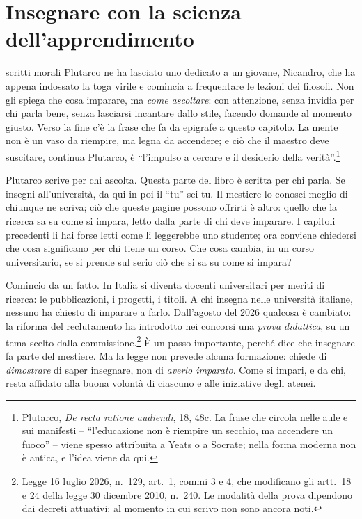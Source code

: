 \chapter{Insegnare con la scienza dell'apprendimento}
\label{cap:docenti}


 scritti morali Plutarco ne ha lasciato uno
dedicato a un giovane, Nicandro, che ha appena indossato la toga
virile e comincia a frequentare le lezioni dei filosofi. Non gli
spiega che cosa imparare, ma \emph{come ascoltare}: con attenzione,
senza invidia per chi parla bene, senza lasciarsi incantare dallo
stile, facendo domande al momento giusto. Verso la fine c'è la frase
che fa da epigrafe a questo capitolo. La mente non è un vaso da
riempire, ma legna da accendere; e ciò che il maestro deve suscitare,
continua Plutarco, è \enquote{l'impulso a cercare e il desiderio della
verità}.\footnote{Plutarco, \emph{De recta ratione audiendi}, 18,
48c. La frase che circola nelle aule e sui manifesti --
\enquote{l'educazione non è riempire un secchio, ma accendere un
fuoco} -- viene spesso attribuita a Yeats o a Socrate; nella forma
moderna non è antica, e l'idea viene da qui.}

Plutarco scrive per chi ascolta. Questa parte del libro è scritta per
chi parla. Se insegni all'università, da qui in poi il \enquote{tu}
sei tu. Il mestiere lo conosci meglio di chiunque ne scriva; ciò che
queste pagine possono offrirti è altro: quello che la ricerca sa su
come si impara, letto dalla parte di chi deve imparare. I capitoli
precedenti li hai forse letti come li leggerebbe uno studente; ora
conviene chiedersi che cosa significano per chi tiene un corso. Che
cosa cambia, in un corso universitario, se si prende sul serio ciò
che si sa su come si impara?

Comincio da un fatto. In Italia si diventa docenti universitari per
meriti di ricerca: le pubblicazioni, i progetti, i titoli. A chi insegna nelle università italiane, nessuno ha chiesto di
imparare a farlo. Dall'agosto del 2026
qualcosa è cambiato: la riforma del reclutamento ha introdotto nei
concorsi una \emph{prova didattica}, su un tema scelto dalla
commissione.\footnote{Legge 16 luglio 2026, n.~129, art.~1, commi 3 e
4, che modificano gli artt.~18 e 24 della legge 30 dicembre 2010,
n.~240. Le modalità della prova dipendono dai
decreti attuativi: al momento in cui scrivo non sono ancora noti.} È
un passo importante, perché dice che insegnare fa parte del mestiere.
Ma la legge non prevede alcuna formazione: chiede di \emph{dimostrare}
di saper insegnare, non di \emph{averlo imparato}. Come si impari, e
da chi, resta affidato alla buona volontà di ciascuno e alle
iniziative degli atenei.

